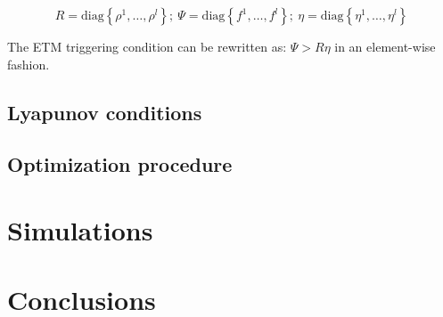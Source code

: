 \documentclass{article}
\begin{document}
\begin{equation}
  R = \text{diag} \left\{ \rho^1, \dots, \rho^l \right\}; \ \Psi = \text{diag}\left\{ f^1, \dots, f^l \right\}; \ \eta = \text{diag} \left\{ \eta^1, \dots, \eta^l \right\}
\end{equation}

The ETM triggering condition can be rewritten as: $\Psi > R \eta$ in an element-wise fashion.



\subsection{Lyapunov conditions}

\subsection{Optimization procedure}

\section{Simulations}

\section{Conclusions}

\printbibliography
\end{document}

